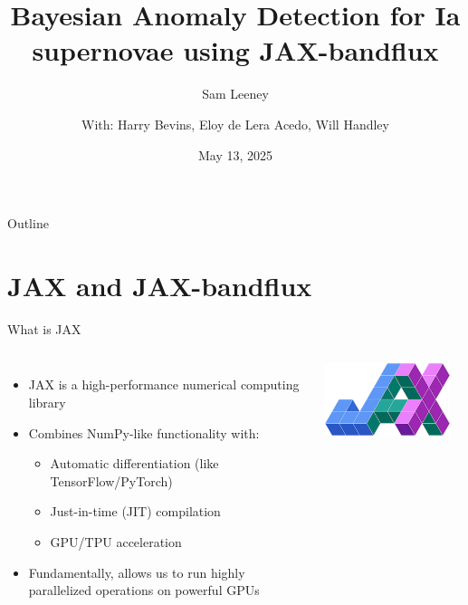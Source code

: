 \documentclass[aspectratio=169]{beamer}
\title{Bayesian Anomaly Detection for Ia supernovae using JAX-bandflux}
\subtitle{Sam Leeney}
\date{May 13, 2025}
\author{With: Harry Bevins, Eloy de Lera Acedo, Will Handley}
\institute{} %
\begin{document}
\begin{frame}
  \titlepage
\end{frame}

\begin{frame}{Outline}
  \tableofcontents[hideallsubsections]
\end{frame}

\section{JAX and JAX-bandflux}

\begin{frame}{What is JAX}
  \begin{columns}
    \begin{itemize}
      \item JAX is a high-performance numerical computing library
      \item Combines NumPy-like functionality with:
        \begin{itemize}
          \item Automatic differentiation (like TensorFlow/PyTorch)
          \item Just-in-time (JIT) compilation
          \item GPU/TPU acceleration
        \end{itemize}
      \item Fundamentally, allows us to run highly parallelized operations on powerful GPUs
    \end{itemize}
    
    \begin{center}
      \includegraphics[width=0.9\textwidth]{images/jax_logo_250px.png}
    \end{center}
  \end{columns}
\end{frame}
\end{document}
